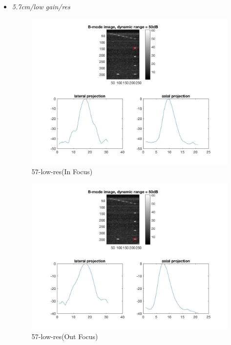 \documentclass[12pts,a4paper]{article}
\begin{document}
\begin{itemize}
\item{\emph{5.7cm/low gain/res}}
\begin{center}
\end{center}
\begin{figure}[h]
    \centering
    \includegraphics[width=1.0\textwidth]{img_hw1/57-low-res1.jpg}
    \caption{57-low-res(In Focus)}
    \label{fig:mesh1}
\end{figure}
\pagebreak
\begin{figure}[h]
    \centering
    \includegraphics[width=1.0\textwidth]{img_hw1/57-low-res2.jpg}
    \caption{57-low-res(Out Focus)}
    \label{fig:mesh1}
\end{figure}
\pagebreak

\end{itemize}
\end{document}
